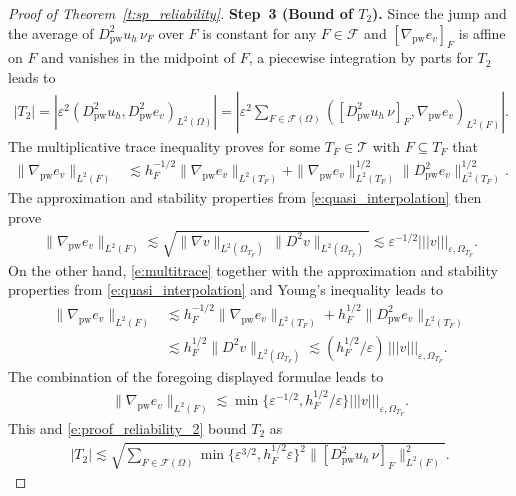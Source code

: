 \documentclass[10pt,a4paper]{amsart}
\newcommand{\ennorm}[1]{\lvert\!\lvert\!\lvert #1 \rvert\!\rvert\!\rvert}
\newcommand{\pw}{\mathrm{pw}}
\newcommand{\tri}{\mathcal{T}}
\begin{document}
\begin{proof}[Proof of Theorem~\ref{t:sp_reliability}]
    \textbf{Step~3 (Bound of $T_2$).}
    Since the jump and the average of 
    $D^2_\pw u_h\,\nu_F$ over $F$  is constant for any $F\in\mathcal{F}$
    and $[\nabla_\pw e_v]_F$ is affine on $F$ and vanishes in the midpoint of $F$,
    a piecewise integration by parts for $T_2$ leads to
    \begin{align}\label{e:proof_reliability_2}
        |T_2|
        =| \varepsilon^2 (D^2_\pw u_h,D^2_\pw e_v)_{L^2(\Omega)}|
        = \left |\varepsilon^2\sum_{F\in\mathcal{F}(\Omega)}
            ([D^2_\pw u_h\,\nu]_F,\nabla_\pw e_v)_{L^2(F)}
          \right|
          .
    \end{align}
    The multiplicative trace inequality proves for some
    $T_F\in\tri$ with $F\subseteq T_F$ that
    \begin{align}\label{e:multitrace}
        \|\nabla_\pw e_v\|_{L^2(F)}
        &\lesssim h_F^{-1/2} \|\nabla_\pw e_v\|_{L^2(T_F)}
            + \|\nabla_\pw e_v\|_{L^2(T_F)}^{1/2}
                \|D^2_\pw e_v\|_{L^2(T_F)}^{1/2}.
    \end{align}
    The approximation and stability properties from
    \eqref{e:quasi_interpolation} then prove
    \begin{align*}
    \|\nabla_\pw e_v\|_{L^2(F)}
        \lesssim \sqrt{\|\nabla  v\|_{L^2(\Omega_{T_F})} 
                    \,\|D^2  v\|_{L^2(\Omega_{T_F})}}
        \lesssim \varepsilon^{-1/2} \ennorm{v}_{\varepsilon,\Omega_{T_F}}.
    \end{align*}
    On the other hand, \eqref{e:multitrace}
    together with the approximation and stability properties
    from \eqref{e:quasi_interpolation} and Young's inequality 
    leads to
    \begin{align*}
        \|\nabla_\pw e_v\|_{L^2(F)}
        &\lesssim h_F^{-1/2} \lVert \nabla_\pw e_v\rVert_{L^2(T_F)}
           + h_F^{1/2} \lVert D^2_\pw e_v\rVert_{L^2(T_F)}\\
        &\lesssim h_F^{1/2} \lVert D^2 v\rVert_{L^2(\Omega_{T_F})}
        \lesssim (h_F^{1/2}/\varepsilon)\, \ennorm{v}_{\varepsilon,\Omega_{T_F}}.
    \end{align*}
    The combination of the foregoing displayed formulae leads to
    \begin{align}\label{e:proof_reliability_3}
        \|\nabla_\pw e_v\|_{L^2(F)}
        \lesssim \min\{\varepsilon^{-1/2},h_F^{1/2}/\varepsilon\}
        \ennorm{v}_{\varepsilon,\Omega_{T_F}}.
    \end{align}
    This and \eqref{e:proof_reliability_2} bound $T_2$ as
    \begin{align*}
        |T_2|
        \lesssim \sqrt{\sum_{F\in\mathcal{F}(\Omega)}
            \min\{\varepsilon^{3/2},h_F^{1/2}\varepsilon\}^2
               \lVert [D^2_\pw u_h\,\nu]_F\rVert_{L^2(F)}^2}.
    \end{align*}
    

\end{proof}
\end{document}
